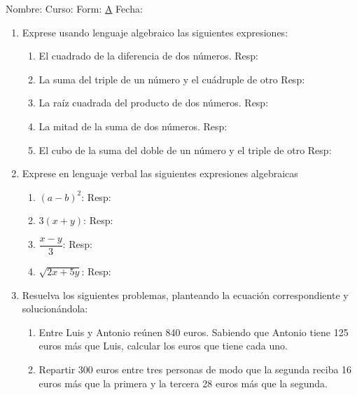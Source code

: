 \documentclass[letterpaper,fleqn]{article}
\newcommand{\LineaNombre}{%
\par
\vspace{\baselineskip}
Nombre:\hrulefill \; Curso: \underline{\hspace*{48pt}} \; Form: \underline{A} \; Fecha: \underline{\hspace*{2.5cm}} \relax
\par}
\begin{document}
\LineaNombre
\begin{enumerate}
 \item Exprese usando lenguaje algebraico las siguientes expresiones:
 \begin{enumerate}
  \item El cuadrado de la diferencia de dos números. \hspace{1cm} Resp: \hrulefill 
  \item La suma del triple de un número y el cuádruple de otro \hspace{1cm} Resp: \hrulefill
  \item La raíz cuadrada del producto de dos números. \hspace{1cm} Resp: \hrulefill
  \item La mitad de la suma de dos números. \hspace{1cm} Resp: \hrulefill
  \item El cubo de la suma del doble de un número y el triple de otro \hspace{1cm} Resp: \hrulefill
 \end{enumerate}
\item Exprese en lenguaje verbal las siguientes expresiones algebraicas
\begin{enumerate}
 \item $(a-b)^{2}$:\hspace{1cm} Resp: \hrulefill
 \item $3(x+y)$: \hspace{1cm} Resp: \hrulefill
 \item $\dfrac{x-y}{3}$:\hspace{1cm} Resp: \hrulefill
 \item $\sqrt{2x+5y}$:\hspace{1cm} Resp: \hrulefill
\end{enumerate}
\item Resuelva los siguientes problemas, planteando la ecuación correspondiente y solucionándola:
\begin{enumerate}
 \item  Entre Luis y Antonio reúnen 840 euros. Sabiendo que Antonio tiene 125 euros más que Luis, calcular los euros que tiene cada uno. \noanswer
  \item Repartir 300 euros entre tres personas de modo que la segunda reciba 16 euros más que la primera y la tercera 28 euros más que la segunda. \noanswer

\end{enumerate}
\end{enumerate}
\end{document}
